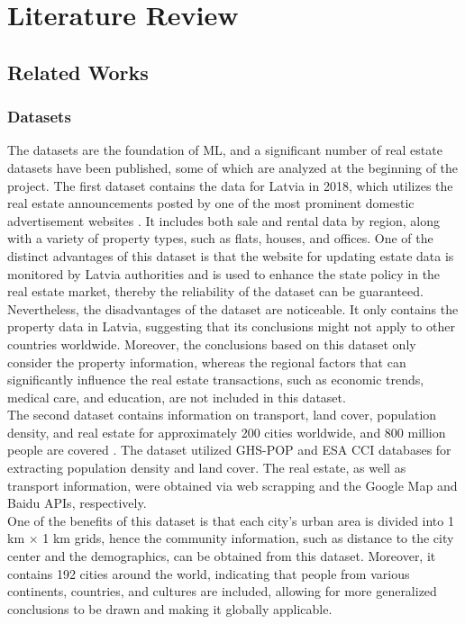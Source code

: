 \documentclass[12pt,twoside]{report}
\begin{document}
\chapter{Literature Review}
\section{Related Works} 
\subsection{Datasets}
The datasets are the foundation of ML, and a significant number of real estate datasets have been published, some of which are analyzed at the beginning of the project. The first dataset contains the data for Latvia in 2018, which utilizes the real estate announcements posted by one of the most prominent domestic advertisement websites \citep{RN22}. It includes both sale and rental data by region, along with a variety of property types, such as flats, houses, and offices. One of the distinct advantages of this dataset is that the website for updating estate data is monitored by Latvia authorities and is used to enhance the state policy in the real estate market, thereby the reliability of the dataset can be guaranteed.
\\

Nevertheless, the disadvantages of the dataset are noticeable. It only contains the property data in Latvia, suggesting that its conclusions might not apply to other countries worldwide. Moreover, the conclusions based on this dataset only consider the property information, whereas the regional factors that can significantly influence the real estate transactions, such as economic trends, medical care, and education, are not included in this dataset.
\\

The second dataset contains information on transport, land cover, population density, and real estate for approximately 200 cities worldwide, and 800 million people are covered \citep{RN26}. The dataset utilized GHS-POP and ESA CCI databases for extracting population density and land cover. The real estate, as well as transport information, were obtained via web scrapping and the Google Map and Baidu APIs, respectively.
\\ 

One of the benefits of this dataset is that each city's urban area is divided into 1 km $\times$ 1 km grids, hence the community information, such as distance to the city center and the demographics, can be obtained from this dataset. Moreover, it contains 192 cities around the world, indicating that people from various continents, countries, and cultures are included, allowing for more generalized conclusions to be drawn and making it globally applicable. 
\\
\end{document}
